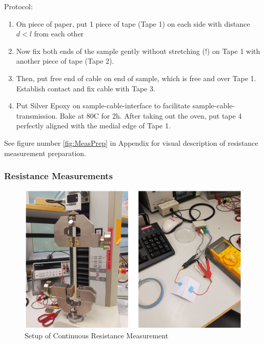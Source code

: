 Protocol:

\begin{enumerate}
    \item On piece of paper, put 1 piece of tape (Tape 1) on each side with distance $d < l$ from each other
    \item Now fix both ends of the sample gently without stretching (!) on Tape 1 with another piece of tape (Tape 2).
    \item Then, put free end of cable on end of sample, which is free and over Tape 1. Establish contact and fix cable with Tape 3.
    \item Put Silver Epoxy on sample-cable-interface to facilitate sample-cable-transmission. Bake at 80\textdegree C for 2h. After taking out the oven, put tape 4 perfectly aligned with the medial edge of Tape 1.
\end{enumerate}

    \begin{center}
    
See figure number \ref{fig:MeasPrep} in Appendix for visual description of resistance measurement preparation.
    \end{center}


\subsubsection{Resistance Measurements}

\begin{figure}[H]
    \centerline{\includegraphics[scale=0.7]{./pic/MethodsResMeasurement.PNG}}
    \caption{Setup of Continuous Resistance Measurement}
    \label{fig:GoldConc}
\end{figure}

